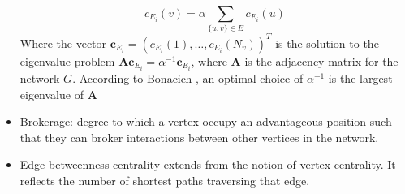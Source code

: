 \begin{itemize}
\begin{equation} c_{E_i}(v)=\alpha \sum_{\{u,v\}\in E}c_{E_i}(u) \end{equation} Where the vector $\mathbf{c}_{E_i}=(c_{E_i}(1),\dots ,c_{E_i}(N_v))^T$ is the solution to the eigenvalue problem $\mathbf{Ac}_{E_i}=\alpha^{-1}\mathbf{c}_{E_i}$, where $\mathbf{A}$ is the adjacency matrix for the network $G$. According to Bonacich \cite{bonacich_factoring_1972}, an optimal choice of $\alpha^{-1}$ is the largest eigenvalue of $\mathbf{A}$
\item Brokerage: degree to which a vertex occupy an advantageous position such that they can broker interactions between other vertices in the network.
\item Edge betweenness centrality extends from the notion of vertex centrality. It reflects the number of shortest paths traversing that edge. %
\end{itemize}
\pagebreak

